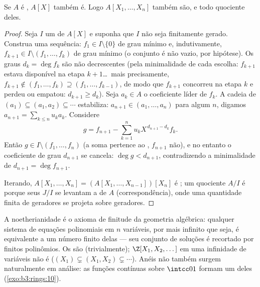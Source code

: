 \begin{theorem}\label{thm:b3:rings:hilbert}
Se $A$ é , $A[X]$ também é. Logo $A[X_1, \dots,
X_n]$ também são, e
todo quociente deles.
\end{theorem}

\begin{proof}
Seja $I$ um  de $A[X]$ e suponha que $I$ não seja
finitamente gerado. Construa uma sequência: $f_1 \in I \setminus \{0\}$ de grau mínimo e,
indutivamente, $f_{k+1} \in I \setminus (f_1,
\dots, f_k)$ de grau mínimo (o conjunto é não vazio, por
hipótese). Os graus $d_k = \deg f_k$ são não decrescentes (pela minimalidade de
cada escolha: $f_{k+1}$ estava disponível na etapa $k+1$\dots\ mais
precisamente, $f_{k+1} \notin (f_1,\dots,f_k) \supseteq
(f_1, \dots, f_{k-1})$, de modo que $f_{k+1}$ concorreu na etapa $k$ e
perdeu ou empatou: $d_{k+1} \geq d_k$). Seja $a_k \in A$ o coeficiente líder de $f_k$.
A cadeia de  $(a_1) \subseteq (a_1,
a_2) \subseteq \cdots$ estabiliza: $a_{n+1} \in (a_1, \dots,
a_n)$ para algum $n$, digamos
$a_{n+1} = \sum_{k\leq n} u_k a_k$. Considere
\[
g = f_{n+1} - \sum_{k=1}^{n} u_k X^{\,d_{n+1} - d_k} f_k .
\]
Então $g \in I \setminus (f_1, \dots, f_n)$ (a soma pertence ao , $f_{n+1}$ não), e no entanto o
coeficiente de grau $d_{n+1}$ se cancela: $\deg g < d_{n+1}$, contradizendo a
minimalidade de $d_{n+1} = \deg f_{n+1}$.

Iterando, $A[X_1, \dots, X_n] = (A[X_1, \dots, X_{n-1}])[X_n]$ é ; um quociente $A/I$ é 
porque seus  $J/I$ se levantam a  de $A$
(correspondência), onde uma quantidade finita de geradores se projeta
sobre geradores.
\end{proof}

\begin{remark}\label{rem:b3:rings:noethmeaning}
A noetherianidade é o axioma de finitude da geometria algébrica:
qualquer sistema de equações polinomiais em $n$ variáveis, por mais
infinito que seja, é equivalente a um número finito delas --- seu
conjunto de soluções é recortado por finitos polinômios. Os  são
 (trivialmente); $\Z[X_1, X_2, \dots]$ em uma infinidade de variáveis não é
($(X_1) \subsetneq (X_1, X_2) \subsetneq \cdots$). Anéis não  também surgem naturalmente em análise:
as funções contínuas sobre $\intcc01$ formam um deles (\cref{exo:b3:rings:10}).
\end{remark}


